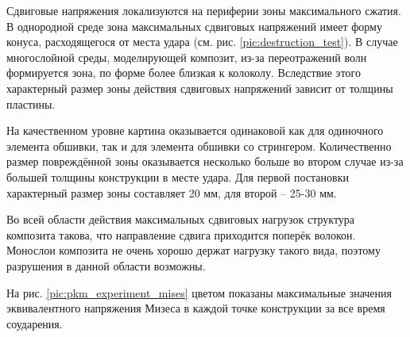 Сдвиговые напряжения локализуются на периферии зоны максимального сжатия. В однородной среде зона максимальных сдвиговых напряжений имеет форму конуса, расходящегося от места удара (см. рис. \ref{pic:destruction_test}). В случае многослойной среды, моделирующей композит, из-за переотражений волн формируется зона, по форме более близкая к колоколу. Вследствие этого характерный размер зоны действия сдвиговых напряжений зависит от толщины пластины.

На качественном уровне картина оказывается одинаковой как для одиночного элемента обшивки, так и для элемента обшивки со стрингером. Количественно размер повреждённой зоны оказывается несколько больше во втором случае из-за большей толщины конструкции в месте удара. Для первой постановки характерный размер зоны составляет 20 мм, для второй -- 25-30 мм.

Во всей области действия максимальных сдвиговых нагрузок структура композита такова, что направление сдвига приходится поперёк волокон. Монослои композита не очень хорошо держат нагрузку такого вида, поэтому разрушения в данной области возможны.


\clearpage
\newpage


На рис. \ref{pic:pkm_experiment_mises} цветом показаны максимальные значения эквивалентного напряжения Мизеса в каждой точке конструкции за все время соударения.

